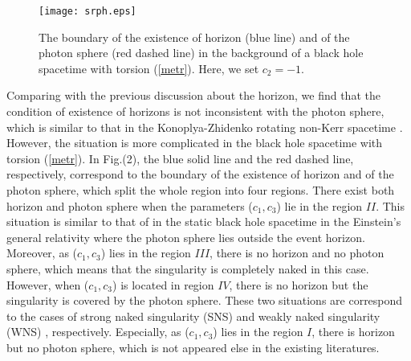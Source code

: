 \documentclass[aps,showpacs,preprintnumbers,amsmath,amssymb]{revtex4}
\begin{document}
\begin{figure}
\begin{center}
\texttt{[image: srph.eps]}
\caption{ The boundary of the existence of horizon (blue line) and of the photon sphere (red dashed line) in the background of a black hole spacetime with torsion (\ref{metr}).  Here, we set $c_2=-1$.}
\end{center}
\end{figure}
Comparing with the previous discussion about the horizon, we find that the condition of existence of horizons is not inconsistent with the photon sphere, which is similar to that in the Konoplya-Zhidenko rotating non-Kerr spacetime \cite{Song2}. However, the situation is more complicated in the black hole spacetime with torsion (\ref{metr}). In Fig.(2),  the blue solid line and the red dashed line, respectively, correspond to the boundary of the existence of horizon and of the photon sphere, which split the whole region into four regions.
There exist both horizon and  photon sphere when the parameters ($c_1, c_3$) lie in the region $II$. This situation is similar to that of in the static black hole spacetime in the Einstein's general relativity where the photon sphere lies outside the event horizon.
Moreover, as ($c_1, c_3$) lies in the region $III$, there is no horizon and no photon sphere, which means that the singularity is completely naked in this case. However, when ($c_1, c_3$) is located in region $IV$, there is no horizon but the singularity is covered by the photon sphere. These two situations are correspond to the cases of strong naked singularity (SNS) and weakly naked singularity (WNS) \cite{KS4,Gyulchev1}, respectively. Especially, as ($c_1, c_3$) lies in the region $I$, there is horizon but no photon sphere, which is not appeared else in the existing literatures.
\end{document}
